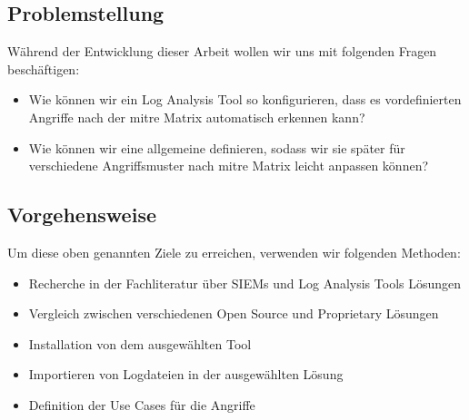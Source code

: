 \subsection{Problemstellung}
Während der Entwicklung dieser Arbeit wollen wir uns mit folgenden Fragen beschäftigen: 

\begin{itemize}[noitemsep]
   \item Wie können wir ein Log Analysis Tool so konfigurieren, dass es vordefinierten Angriffe nach der \gls{mitre} Matrix automatisch erkennen kann? 
   \item Wie können wir eine allgemeine  definieren, sodass wir sie später für verschiedene Angriffsmuster nach \gls{mitre} Matrix leicht anpassen können?
\end{itemize}


\subsection{Vorgehensweise}
Um diese oben genannten Ziele zu erreichen, verwenden wir folgenden Methoden: 

\begin{itemize}[noitemsep]
   \item	Recherche in der Fachliteratur über SIEMs und Log Analysis Tools Lösungen 
   \item	Vergleich zwischen verschiedenen Open Source und Proprietary Lösungen 
   \item	Installation von dem ausgewählten Tool 
   \item	Importieren von Logdateien in der ausgewählten Lösung 
   \item	Definition der Use Cases für die Angriffe
\end{itemize}